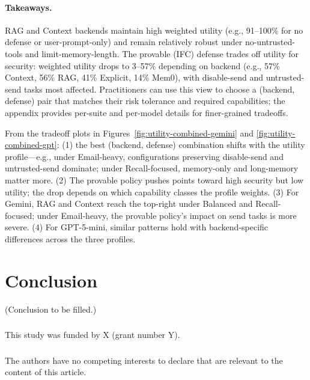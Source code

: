 \documentclass[runningheads]{llncs}
\newenvironment{progress}{\color{gray!50}}{}
\begin{document}
\begin{progress}
\paragraph{Takeaways.}
RAG and Context backends maintain high weighted utility (e.g., 91--100\% for no defense or user-prompt-only) and remain relatively robust under no-untrusted-tools and limit-memory-length. The provable (IFC) defense trades off utility for security: weighted utility drops to 3--57\% depending on backend (e.g., 57\% Context, 56\% RAG, 41\% Explicit, 14\% Mem0), with disable-send and untrusted-send tasks most affected. Practitioners can use this view to choose a (backend, defense) pair that matches their risk tolerance and required capabilities; the appendix provides per-suite and per-model details for finer-grained tradeoffs.

From the tradeoff plots in Figures~\ref{fig:utility-combined-gemini} and \ref{fig:utility-combined-gpt}: (1) the best (backend, defense) combination shifts with the utility profile---e.g., under Email-heavy, configurations preserving disable-send and untrusted-send dominate; under Recall-focused, memory-only and long-memory matter more. (2) The provable policy pushes points toward high security but low utility; the drop depends on which capability classes the profile weights. (3) For Gemini, RAG and Context reach the top-right under Balanced and Recall-focused; under Email-heavy, the provable policy's impact on send tasks is more severe. (4) For GPT-5-mini, similar patterns hold with backend-specific differences across the three profiles.
%
\section{Conclusion}
(Conclusion to be filled.)
%
\begin{credits}
\subsubsection{\ackname} This study was funded by X (grant number Y).

\subsubsection{\discintname}
The authors have no competing interests to declare that are relevant to the content of this article.
\end{credits}
%
%
%


%

\end{progress}
%
\end{document}
